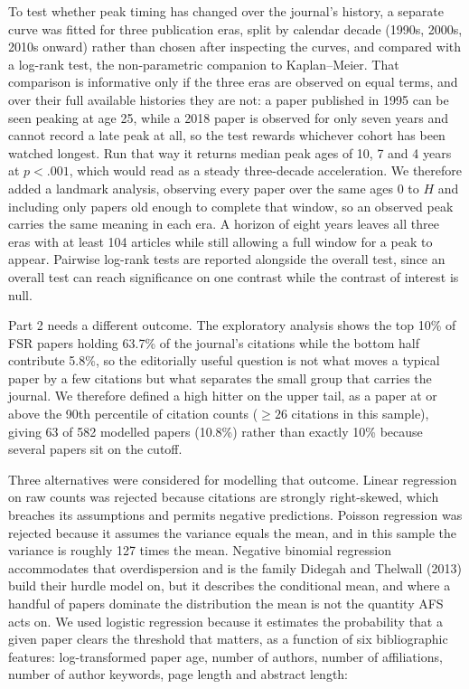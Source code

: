 \documentclass[11pt,a4paper]{article}
\begin{document}
To test whether peak timing has changed over the journal's history, a separate curve was fitted for three publication eras, split by calendar decade (1990s, 2000s, 2010s onward) rather than chosen after inspecting the curves, and compared with a log-rank test, the non-parametric companion to Kaplan--Meier. That comparison is informative only if the three eras are observed on equal terms, and over their full available histories they are not: a paper published in 1995 can be seen peaking at age 25, while a 2018 paper is observed for only seven years and cannot record a late peak at all, so the test rewards whichever cohort has been watched longest. Run that way it returns median peak ages of 10, 7 and 4 years at $p < .001$, which would read as a steady three-decade acceleration. We therefore added a landmark analysis, observing every paper over the same ages 0 to $H$ and including only papers old enough to complete that window, so an observed peak carries the same meaning in each era. A horizon of eight years leaves all three eras with at least 104 articles while still allowing a full window for a peak to appear. Pairwise log-rank tests are reported alongside the overall test, since an overall test can reach significance on one contrast while the contrast of interest is null.

Part 2 needs a different outcome. The exploratory analysis shows the top 10\% of FSR papers holding 63.7\% of the journal's citations while the bottom half contribute 5.8\%, so the editorially useful question is not what moves a typical paper by a few citations but what separates the small group that carries the journal. We therefore defined a high hitter on the upper tail, as a paper at or above the 90th percentile of citation counts (\(\geq 26\) citations in this sample), giving 63 of 582 modelled papers (10.8\%) rather than exactly 10\% because several papers sit on the cutoff.

Three alternatives were considered for modelling that outcome. Linear regression on raw counts was rejected because citations are strongly right-skewed, which breaches its assumptions and permits negative predictions. Poisson regression was rejected because it assumes the variance equals the mean, and in this sample the variance is roughly 127 times the mean. Negative binomial regression accommodates that overdispersion and is the family Didegah and Thelwall (2013) build their hurdle model on, but it describes the conditional mean, and where a handful of papers dominate the distribution the mean is not the quantity AFS acts on. We used logistic regression because it estimates the probability that a given paper clears the threshold that matters, as a function of six bibliographic features: log-transformed paper age, number of authors, number of affiliations, number of author keywords, page length and abstract length:
\end{document}
